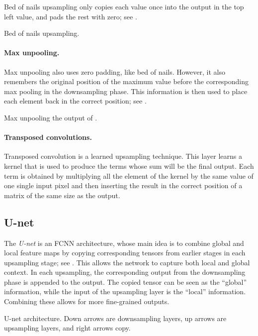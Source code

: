 Bed of nails upsampling only copies each value once into the output in the top left value, and pads
the rest with zero; see .

\begin{marginfigure}
    \centering
    \caption{Bed of nails upsampling.}
    \label{fig:bed-of-nails-upsampling}
\end{marginfigure}

\paragraph{Max unpooling.}

Max unpooling also uses zero padding, like bed of nails. However, it also remembers the original
position of the maximum value before the corresponding max pooling in the downsampling phase. This
information is then used to place each element back in the correct position; see
.

\begin{marginfigure}
    \centering
    \caption{Max unpooling the output of .}
    \label{fig:max-unpooling}
\end{marginfigure}

\paragraph{Transposed convolutions.}

Transposed convolution \citep{shelhamer2016fully} is a learned upsampling technique. This layer
learns a kernel that is used to produce the terms whose sum will be the final output. Each term is
obtained by multiplying all the element of the kernel by the same value of one single input pixel
and then inserting the result in the correct position of a matrix of the same size as the output.

\subsection{U-net}

The \textit{U-net} \citep{ronneberger2015unet} is an FCNN architecture, whose main idea is to
combine global and local feature maps by copying corresponding tensors from earlier stages in each
upsampling stage; see . This allows the network to capture both local and global
context. In each upsampling, the corresponding output from the downsampling phase is appended to
the output. The copied tensor can be seen as the ``global'' information, while the input of the
upsampling layer is the ``local'' information. Combining these allows for more fine-grained
outputs.

\begin{marginfigure}
    \centering
    \caption{U-net architecture. Down arrows are downsampling layers, up arrows are upsampling layers, and right arrows copy.}
    \label{fig:u-net}
\end{marginfigure}
